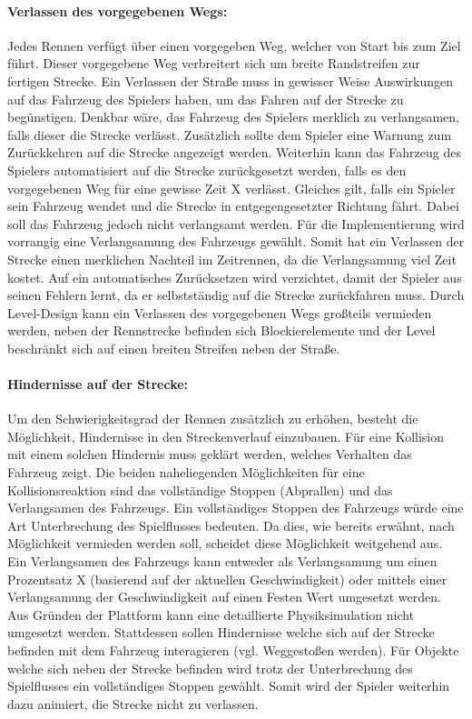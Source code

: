 		\paragraph{Verlassen des vorgegebenen Wegs:}\label{par:streckendesign}
		Jedes Rennen verfügt über einen vorgegeben Weg, welcher von Start bis zum Ziel führt. Dieser vorgegebene Weg verbreitert sich um breite Randstreifen zur fertigen Strecke. Ein Verlassen der Straße muss in gewisser Weise Auswirkungen auf das Fahrzeug des Spielers haben, um das Fahren auf der Strecke zu begünstigen. Denkbar wäre, das Fahrzeug des Spielers merklich zu verlangsamen, falls dieser die Strecke verlässt. Zusätzlich sollte dem Spieler eine Warnung zum Zurückkehren auf die Strecke angezeigt werden. Weiterhin kann das Fahrzeug des Spielers automatisiert auf die Strecke zurückgesetzt werden, falls es den vorgegebenen Weg für eine gewisse Zeit X verlässt. Gleiches gilt, falls ein Spieler sein Fahrzeug wendet und die Strecke in entgegengesetzter Richtung fährt. Dabei soll das Fahrzeug jedoch nicht verlangsamt werden. Für die Implementierung wird vorrangig eine Verlangsamung des Fahrzeugs gewählt.
		Somit hat ein Verlassen der Strecke einen merklichen Nachteil im Zeitrennen, da die Verlangsamung viel Zeit kostet. Auf ein automatisches Zurücksetzen wird verzichtet, damit der Spieler aus seinen Fehlern lernt, da er selbstständig auf die Strecke zurückfahren muss. Durch Level-Design kann ein Verlassen des vorgegebenen Wegs großteils vermieden werden, neben der Rennstrecke befinden sich Blockierelemente und der Level beschränkt sich auf einen breiten Streifen neben der Straße.

		\paragraph{Hindernisse auf der Strecke:}\label{par:streckendesign2}
		Um den Schwierigkeitsgrad der Rennen zusätzlich zu erhöhen, besteht die Möglichkeit, Hindernisse in den Streckenverlauf einzubauen. Für eine Kollision mit einem solchen Hindernis muss geklärt werden, welches Verhalten das Fahrzeug zeigt. Die beiden naheliegenden Möglichkeiten für eine Kollisionsreaktion sind das vollständige Stoppen (Abprallen) und das Verlangsamen des Fahrzeugs.
		Ein vollständiges Stoppen des Fahrzeugs würde eine Art Unterbrechung des Spielflusses bedeuten. Da dies, wie bereits erwähnt, nach Möglichkeit vermieden werden soll, scheidet diese Möglichkeit weitgehend aus. Ein Verlangsamen des Fahrzeugs kann entweder als Verlangsamung um einen Prozentsatz X (basierend auf der aktuellen Geschwindigkeit) oder mittels einer Verlangsamung der Geschwindigkeit auf einen Festen Wert umgesetzt werden.
		Aus Gründen der Plattform kann eine detaillierte Physiksimulation nicht umgesetzt werden. Stattdessen sollen Hindernisse welche sich auf der Strecke befinden mit dem Fahrzeug interagieren (vgl. Weggestoßen werden). Für Objekte welche sich neben der Strecke befinden wird trotz der Unterbrechung des Spielflusses ein vollständiges Stoppen gewählt. Somit wird der Spieler weiterhin dazu animiert, die Strecke nicht zu verlassen.

